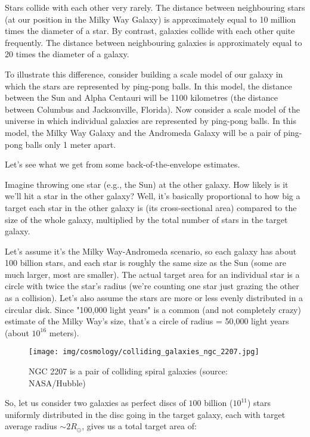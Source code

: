 	Stars collide with each other very rarely. The distance between neighbouring stars (at our position in the Milky Way Galaxy) is approximately equal to 10 million times the diameter of a star. By contrast, galaxies collide with each other quite frequently. The distance between neighbouring galaxies is approximately equal to 20 times the diameter of a galaxy.

	To illustrate this difference, consider building a scale model of our galaxy in which the stars are represented by ping-pong balls. In this model, the distance between the Sun and Alpha Centauri will be 1100 kilometres (the distance between Columbus and Jacksonville, Florida). Now consider a scale model of the universe in which individual galaxies are represented by ping-pong balls. In this model, the Milky Way Galaxy and the Andromeda Galaxy will be a pair of ping-pong balls only 1 meter apart.
	
	Let's see what we get from some back-of-the-envelope estimates.

	Imagine throwing one star (e.g., the Sun) at the other galaxy. How likely is it we'll hit a star in the other galaxy? Well, it's basically proportional to how big a target each star in the other galaxy is (its cross-sectional area) compared to the size of the whole galaxy, multiplied by the total number of stars in the target galaxy.

	Let's assume it's the Milky Way-Andromeda scenario, so each galaxy has about 100 billion stars, and each star is roughly the same size as the Sun (some are much larger, most are smaller). The actual target area for an individual star is a circle with twice the star's radius (we're counting one star just grazing the other as a collision). Let's also assume the stars are more or less evenly distributed in a circular disk. Since "100,000 light years" is a common (and not completely crazy) estimate of the Milky Way's size, that's a circle of radius = 50,000 light years (about $10^{16}$ meters).

	\begin{figure}[H]
		\centering
		\texttt{[image: img/cosmology/colliding\_galaxies\_ngc\_2207.jpg]}
		\caption{NGC 2207 is a pair of colliding spiral galaxies (source: NASA/Hubble)}
	\end{figure} 
	
	So, let us consider two galaxies as perfect discs of $100$ billion ($10^{11}$) stars uniformly distributed in the disc going  in the target galaxy, each with target average radius $\sim 2 R_{\odot}$, gives us a total target area of:
	

